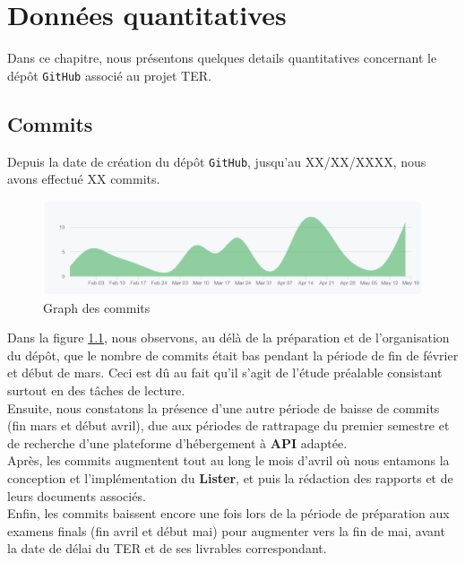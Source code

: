 \documentclass[12pt,a4paper]{report}
\begin{document}
\chapter{Données quantitatives}
Dans ce chapitre, nous présentons quelques details quantitatives concernant le dépôt \texttt{GitHub} associé au projet TER.

\section{Commits}
Depuis la date de création du dépôt \texttt{GitHub}, jusqu'au XX/XX/XXXX, nous avons effectué XX commits. %

\begin{figure}[!ht]
\hspace*{-2.6cm}
\includegraphics[scale=0.55]{images/contributor_graph_git.PNG}
\caption{Graph des commits}
\label{fig:commits}
\end{figure}

Dans la figure \textcolor{BrickRed}{\ref{fig:commits}}, nous observons, au délà de la préparation et de l'organisation du dépôt, que le nombre de commits était bas pendant la période de fin de février et début de mars. Ceci est dû au fait qu'il s'agit de l'étude préalable consistant surtout en des tâches de lecture.\\
Ensuite, nous constatons la présence d'une autre période de baisse de commits (fin mars et début avril), due aux périodes de rattrapage du premier semestre et de recherche d'une plateforme d'hébergement à \textbf{API} adaptée.\\
Après, les commits augmentent tout au long le mois d'avril où nous entamons la conception et l'implémentation du \textbf{Lister}, et puis la rédaction des rapports et de leurs documents associés.\\
Enfin, les commits baissent encore une fois lors de la période de préparation aux examens finals (fin avril et début mai) pour augmenter vers la fin de mai, avant la date de délai du TER et de ses livrables correspondant.
\end{document}
